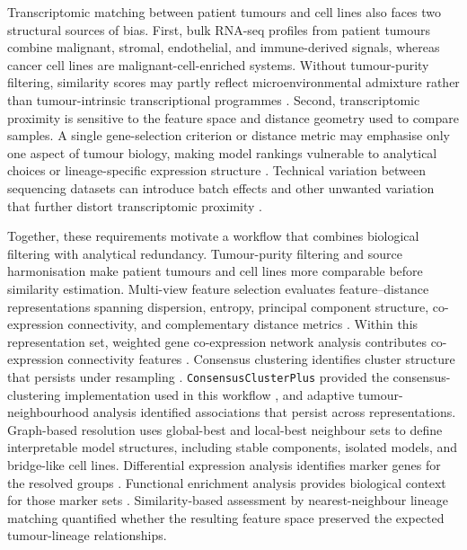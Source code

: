 Transcriptomic matching between patient tumours and cell lines also faces two structural sources of bias. First, bulk RNA-seq profiles from patient tumours combine malignant, stromal, endothelial, and immune-derived signals, whereas cancer cell lines are malignant-cell-enriched systems. Without tumour-purity filtering, similarity scores may partly reflect microenvironmental admixture rather than tumour-intrinsic transcriptional programmes \citep{Yoshihara2013}. Second, transcriptomic proximity is sensitive to the feature space and distance geometry used to compare samples. A single gene-selection criterion or distance metric may emphasise only one aspect of tumour biology, making model rankings vulnerable to analytical choices or lineage-specific expression structure \citep{Solorio-Fernandez2020,Kallberg2021}. Technical variation between sequencing datasets can introduce batch effects and other unwanted variation that further distort transcriptomic proximity \citep{Leek2010BatchEffects,Leek2012}.

Together, these requirements motivate a workflow that combines biological filtering with analytical redundancy. Tumour-purity filtering and source harmonisation make patient tumours and cell lines more comparable before similarity estimation. Multi-view feature selection evaluates feature--distance representations spanning dispersion, entropy, principal component structure, co-expression connectivity, and complementary distance metrics \citep{Solorio-Fernandez2020,Kallberg2021}. Within this representation set, weighted gene co-expression network analysis contributes co-expression connectivity features \citep{Langfelder2008WGCNA}. Consensus clustering identifies cluster structure that persists under resampling \citep{Monti2003ConsensusClustering}. \texttt{ConsensusClusterPlus} provided the consensus-clustering implementation used in this workflow \citep{Wilkerson2010ConsensusClusterPlus}, and adaptive tumour-neighbourhood analysis identified associations that persist across representations. Graph-based resolution uses global-best and local-best neighbour sets to define interpretable model structures, including stable components, isolated models, and bridge-like cell lines. Differential expression analysis identifies marker genes for the resolved groups \citep{Love2014}. Functional enrichment analysis provides biological context for those marker sets \citep{Raudvere2019gProfiler}. Similarity-based assessment by nearest-neighbour lineage matching quantified whether the resulting feature space preserved the expected tumour-lineage relationships.

